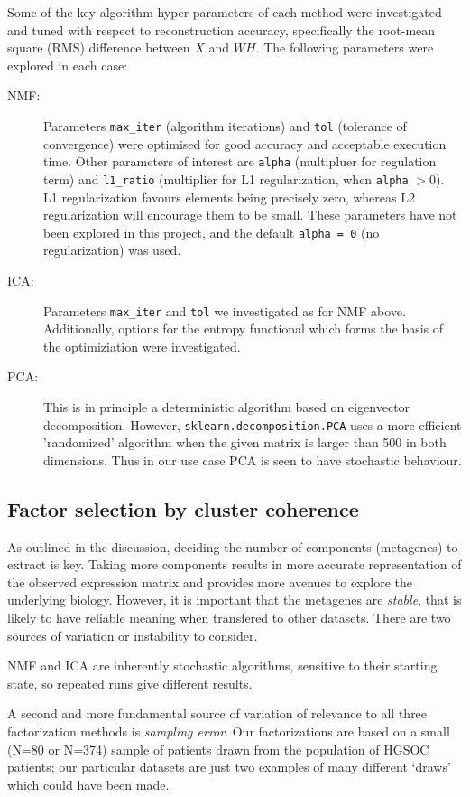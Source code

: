 \documentclass[tikz, 12pt,a4paper,oneside,fleqn]{article}
\begin{document}
Some of the key algorithm hyper parameters of each method were investigated and tuned with respect to reconstruction accuracy, specifically the root-mean square (RMS) difference between $X$ and $WH$. The following parameters were explored in each case:
\begin{description}
\item[NMF:] Parameters {\tt max\_iter} (algorithm iterations) and {\tt tol} (tolerance of convergence) were optimised for good accuracy and acceptable execution time.  Other parameters of interest are {\tt alpha} (multipluer for regulation term) and {\tt l1\_ratio} (multiplier for L1 regularization, when {\tt alpha} $> 0$).  L1 regularization  favours elements being precisely zero, whereas L2 regularization will encourage them to be small.  These parameters have not been explored in this project, and the default {\tt alpha = 0} (no regularization) was used.
\item[ICA:]  Parameters {\tt max\_iter} and {\tt tol} we investigated as for NMF above.  Additionally, options for the entropy functional which forms the basis of the optimiziation were investigated.
\item[PCA:] This is in principle a deterministic algorithm based on eigenvector decomposition.  However, {\tt sklearn.decomposition.PCA} uses a more efficient 'randomized' algorithm when the given matrix is larger than 500 in both dimensions.  Thus in our use case PCA is seen to have stochastic behaviour.

\end{description}

\subsection{Factor selection by cluster coherence}

As outlined in the discussion, deciding the number of components (metagenes) to extract is key.  Taking more components results in more accurate representation of the observed expression matrix and provides more avenues to explore the underlying biology.  However, it is important that the metagenes are \emph{stable}, that is likely to have reliable meaning when transfered to other datasets.   There are two sources of variation or instability to consider.

NMF and ICA are inherently stochastic algorithms, sensitive to their starting state, so repeated runs give different results.

A second and more fundamental source of variation of relevance to all three factorization methods is \emph{sampling error}.   Our factorizations are based on a small (N=80 or N=374) sample of patients drawn from the population of HGSOC patients; our particular datasets are just two examples of many different `draws' which could have been made.  
\end{document}
